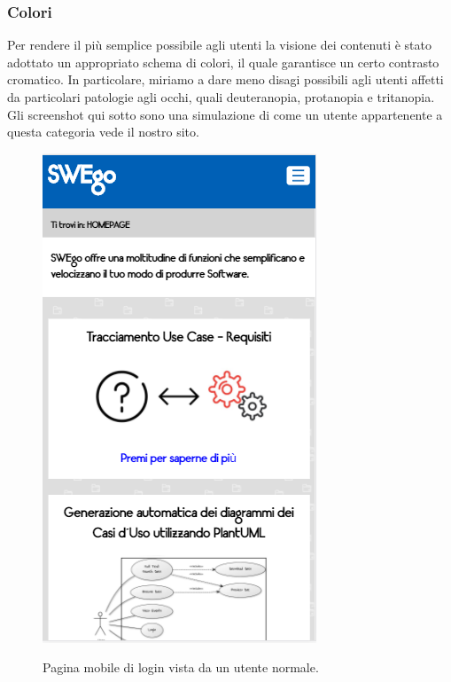 \subsubsection{Colori}
Per rendere il più semplice possibile agli utenti la visione dei contenuti è stato adottato un appropriato schema di colori, il quale garantisce un certo contrasto cromatico.
	In particolare, miriamo a dare meno disagi possibili agli utenti affetti da particolari patologie agli occhi, quali deuteranopia, protanopia e tritanopia. \\
	Gli screenshot qui sotto sono una simulazione di come un utente appartenente a questa categoria vede il nostro sito.\\
	\begin{figure}
	\centering
		\includegraphics[scale=1]{img/normale_mobile.jpeg}\\[1cm] \caption{Pagina mobile di login vista da un utente normale.}
	\end{figure}
